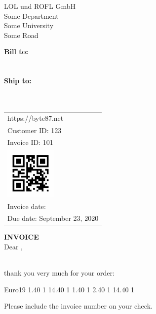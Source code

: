 \documentclass[a4paper]{letter}
\makeatletter
\renewcommand*{\opening}[1]{\ifx\@empty\fromaddress%
  \thispagestyle{firstpage}%
    {\raggedleft\@date\par}%
  \else%
   \thispagestyle{empty}%
   {%
    \begin{minipage}[c]{0.50\linewidth}
    \textbf{Bill to:}\\
    \toname \\
    \toaddress\\
    \textbf{Ship to:}\\[0.1em]%
    \toname \\
    \toaddress\\
    \end{minipage}
    \begin{minipage}[c]{0.45\linewidth}
    \raggedleft\begin{tabular}{l@{}}\ignorespaces
    https://byte87.net\\%
    Customer ID: 123\\%
    Invoice ID: 101\\%
    \includegraphics[height=2.5cm, keepaspectratio=true]{qr.png}\\[0.2em]%
    Invoice date: \@date\\
    Due date: September 23, 2020
    \end{tabular}
    \end{minipage}
    \par
}%
  \fi
  \vspace{2\parskip}%
  #1\par\nobreak}
\makeatother
\begin{document}
%
    \begin{letter}{%
            LOL und ROFL GmbH\\%
            Some Department\\%
            Some University\\%
            Some Road\\%
        }%
%
%       
        \opening{{\large \bf INVOICE} \\[1.0cm] Dear \toname{},}\hfil\\%
            thank you very much for your order: %
%
            \begin{invoice}{Euro}{19} 
             {1.40} {1} 
             {14.40} {1}
             {1.40} {1} 
             {2.40} {1} 
             {14.40} {1}
            \end{invoice} 
%
            Please include the invoice number on your check. %

    \end{letter}%
\end{document}
